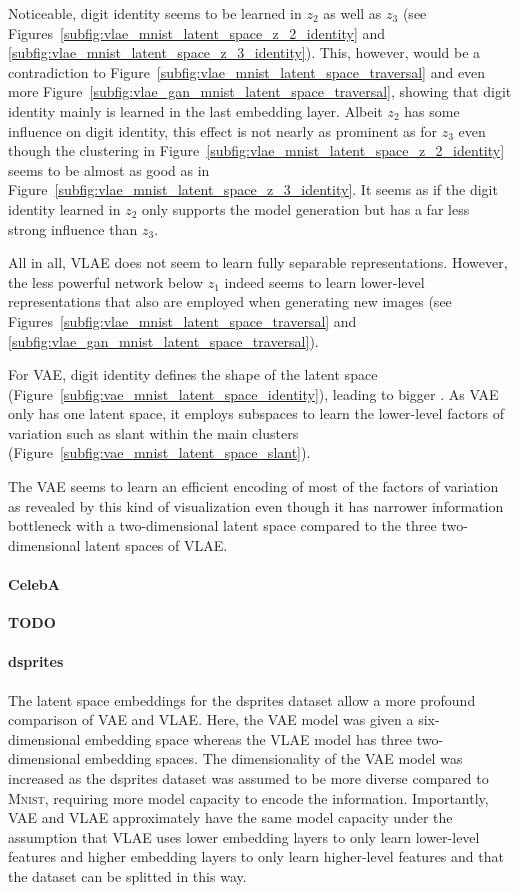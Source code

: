 Noticeable, digit identity seems to be learned in $z_2$ as well as $z_3$ (see Figures~\ref{subfig:vlae_mnist_latent_space_z_2_identity} and \ref{subfig:vlae_mnist_latent_space_z_3_identity}).
This, however, would be a contradiction to Figure~\ref{subfig:vlae_mnist_latent_space_traversal} and even more Figure~\ref{subfig:vlae_gan_mnist_latent_space_traversal}, showing that digit identity mainly is learned in the last embedding layer.
Albeit $z_2$ has some influence on digit identity, this effect is not nearly as prominent as for $z_3$ even though the clustering in Figure~\ref{subfig:vlae_mnist_latent_space_z_2_identity} seems to be almost as good as in Figure~\ref{subfig:vlae_mnist_latent_space_z_3_identity}.
It seems as if the digit identity learned in $z_2$ only supports the model generation but has a far less strong influence than $z_3$.

All in all, \ac{VLAE} does not seem to learn fully separable representations.
However, the less powerful network below $z_1$ indeed seems to learn lower-level representations that also are employed when generating new images (see Figures~\ref{subfig:vlae_mnist_latent_space_traversal} and \ref{subfig:vlae_gan_mnist_latent_space_traversal}).

For \ac{VAE}, digit identity defines the shape of the latent space (Figure~\ref{subfig:vae_mnist_latent_space_identity}), leading to bigger .
As \ac{VAE} only has one latent space, it employs subspaces to learn the lower-level factors of variation such as slant within the main clusters (Figure~\ref{subfig:vae_mnist_latent_space_slant}).

The \ac{VAE} seems to learn an efficient encoding of most of the factors of variation as revealed by this kind of visualization even though it has narrower information bottleneck with a two-dimensional latent space compared to the three two-dimensional latent spaces of \ac{VLAE}.

\paragraph{CelebA}
\textbf{TODO}

\paragraph{dsprites}

The latent space embeddings for the dsprites dataset allow a more profound comparison of \ac{VAE} and \ac{VLAE}.
Here, the \ac{VAE} model was given a six-dimensional embedding space whereas the \ac{VLAE} model has three two-dimensional embedding spaces.
The dimensionality of the \ac{VAE} model was increased as the dsprites dataset was assumed to be more diverse compared to \textsc{Mnist}, requiring more model capacity to encode the information.
Importantly, \ac{VAE} and \ac{VLAE} approximately have the same model capacity under the assumption that \ac{VLAE} uses lower embedding layers to only learn lower-level features and higher embedding layers to only learn higher-level features and that the dataset can be splitted in this way.

